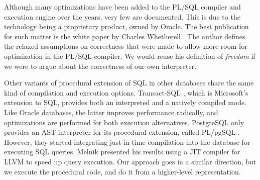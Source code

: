\documentclass[twoside,11pt,a4paper]{article}
\begin{document}
%
%

Although many optimizations have been added to the PL/SQL compiler and execution engine over the years, very few are documented. This is due to the technology being a proprietary product, owned by Oracle. The best publication for such matter is the white paper by Charles Whetherell \cite{freedomplsopt}. The author defines the relaxed assumptions on correctness that were made to allow more room for optimization in the PL/SQL compiler. We would reuse his definition of \textit{freedom} if we were to argue about the correctness of our own interpreter.

Other variants of procedural extension of SQL in other databases share the same kind of compilation and execution options. Transact-SQL \cite{tsqldoc}, which is Microsoft's extension to SQL, provides both an interpreted and a natively compiled mode. Like Oracle databases, the latter improves performance radically, and optimizations are performed for both execution alternatives. PostgreSQL only provides an AST interpreter for its procedural extension, called PL/pgSQL \cite{plpgsqldoc}. However, they started integrating just-in-time compilation into the database for executing SQL queries. Melnik \cite{postgresllvmjit} presented his results using a JIT compiler for LLVM to speed up query execution. Our approach goes in a similar direction, but we execute the procedural code, and do it from a higher-level representation.
\end{document}

